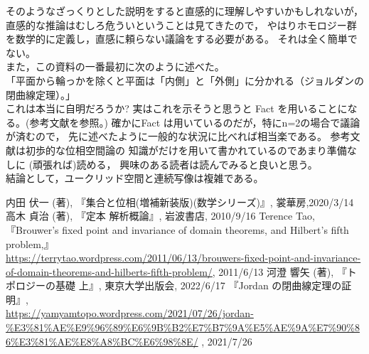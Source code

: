 \documentclass[uplatex]{jsarticle}
\begin{document}
そのようなざっくりとした説明をすると直感的に理解しやすいかもしれないが，
直感的な推論はむしろ危ういということは見てきたので，
やはりホモロジー群を数学的に定義し，直感に頼らない議論をする必要がある。
それは全く簡単でない。\\

また，この資料の一番最初に次のように述べた。\\
「平面から輪っかを除くと平面は「内側」と「外側」に分かれる（ジョルダンの閉曲線定理）。」\\
これは本当に自明だろうか?
実はこれを示そうと思うと
Fact
を用いることになる。(参考文献\cite{jordan}を参照。)
確かにFact
は用いているのだが，特にn=2の場合で議論が済むので，
先に述べたように一般的な状況に比べれば相当楽である。
参考文献\cite{jordan}は初歩的な位相空間論の
知識がだけを用いて書かれているのであまり準備なしに
(頑張れば)読める，
興味のある読者は読んでみると良いと思う。\\

結論として，ユークリッド空間と連続写像は複雑である。





\begin{thebibliography}{99}
     内田 伏一 (著),
    『集合と位相(増補新装版)(数学シリーズ)』, 裳華房,2020/3/14
     高木 貞治 (著), 『定本 解析概論』, 岩波書店, 2010/9/16
     Terence Tao, 『Brouwer’s fixed point and invariance of domain theorems, and Hilbert’s fifth problem,』\\
    \url{https://terrytao.wordpress.com/2011/06/13/brouwers-fixed-point-and-invariance-of-domain-theorems-and-hilberts-fifth-problem/},
    2011/6/13
     河澄 響矢 (著), 『トポロジーの基礎 上』, 東京大学出版会, 2022/6/17
    『Jordan の閉曲線定理の証明』,\\
    \url{https://yamyamtopo.wordpress.com/2021/07/26/jordan-%E3%81%AE%E9%96%89%E6%9B%B2%E7%B7%9A%E5%AE%9A%E7%90%86%E3%81%AE%E8%A8%BC%E6%98%8E/}
    , 2021/7/26
\end{thebibliography}
\end{document}
